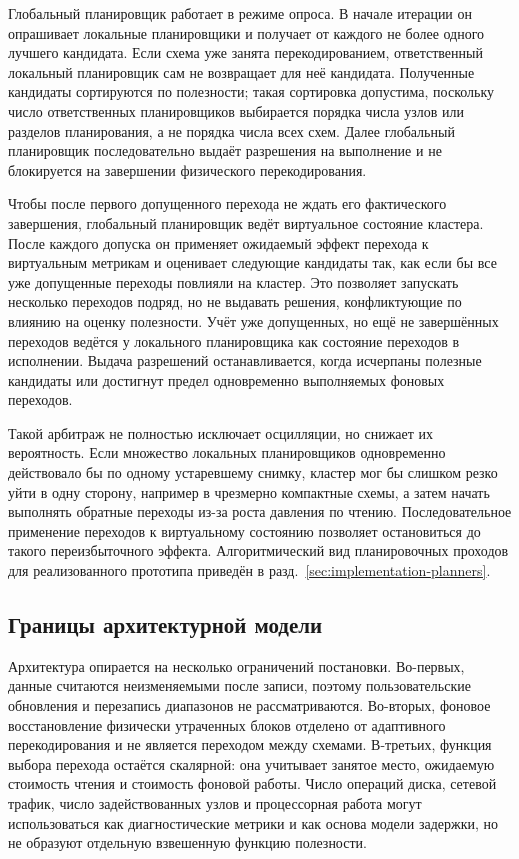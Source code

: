 Глобальный планировщик работает в режиме опроса. В начале итерации он опрашивает
локальные планировщики и получает от каждого не более одного лучшего кандидата.
Если схема уже занята перекодированием, ответственный локальный планировщик сам
не возвращает для неё кандидата. Полученные кандидаты сортируются по полезности;
такая сортировка допустима, поскольку число ответственных планировщиков
выбирается порядка числа узлов или разделов планирования, а не порядка числа
всех схем. Далее глобальный планировщик последовательно выдаёт разрешения на
выполнение и не блокируется на завершении физического перекодирования.

Чтобы после первого допущенного перехода не ждать его фактического завершения,
глобальный планировщик ведёт виртуальное состояние кластера. После каждого
допуска он применяет ожидаемый эффект перехода к виртуальным метрикам и
оценивает следующие кандидаты так, как если бы все уже допущенные переходы
повлияли на кластер. Это позволяет запускать несколько переходов подряд, но не
выдавать решения, конфликтующие по влиянию на оценку полезности. Учёт уже
допущенных, но ещё не завершённых переходов ведётся у локального планировщика
как состояние переходов в исполнении. Выдача разрешений останавливается, когда
исчерпаны полезные кандидаты или достигнут предел одновременно выполняемых
фоновых переходов.

Такой арбитраж не полностью исключает осцилляции, но снижает их вероятность.
Если множество локальных планировщиков одновременно действовало бы по одному
устаревшему снимку, кластер мог бы слишком резко уйти в одну сторону, например
в чрезмерно компактные схемы, а затем начать выполнять обратные переходы из-за
роста давления по чтению. Последовательное применение переходов к виртуальному
состоянию позволяет остановиться до такого переизбыточного эффекта.
Алгоритмический вид планировочных проходов для реализованного прототипа
приведён в разд.~\ref{sec:implementation-planners}.

\PlannerArtifacts

\subsection{Границы архитектурной модели}

Архитектура опирается на несколько ограничений постановки. Во-первых, данные
считаются неизменяемыми после записи, поэтому пользовательские обновления и
перезапись диапазонов не рассматриваются. Во-вторых, фоновое восстановление
физически утраченных блоков отделено от адаптивного перекодирования и не
является переходом между схемами. В-третьих, функция выбора перехода остаётся
скалярной: она учитывает занятое место, ожидаемую стоимость чтения и стоимость
фоновой работы. Число операций диска, сетевой трафик, число задействованных
узлов и процессорная работа могут использоваться как диагностические метрики и
как основа модели задержки, но не образуют отдельную взвешенную функцию
полезности.

\pagebreak
